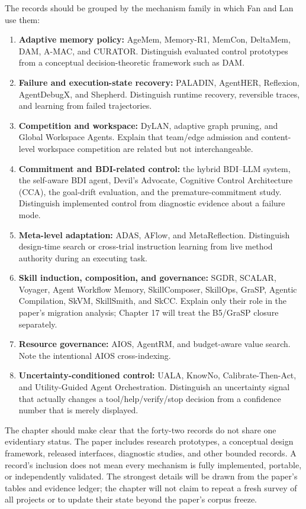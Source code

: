 The records should be grouped by the mechanism family in which Fan and Lan use them:
\begin{enumerate}
  \item \textbf{Adaptive memory policy:} AgeMem, Memory-R1, MemCon, DeltaMem, DAM, A-MAC, and CURATOR. Distinguish evaluated control prototypes from a conceptual decision-theoretic framework such as DAM.
  \item \textbf{Failure and execution-state recovery:} PALADIN, AgentHER, Reflexion, AgentDebugX, and Shepherd. Distinguish runtime recovery, reversible traces, and learning from failed trajectories.
  \item \textbf{Competition and workspace:} DyLAN, adaptive graph pruning, and Global Workspace Agents. Explain that team/edge admission and content-level workspace competition are related but not interchangeable.
  \item \textbf{Commitment and BDI-related control:} the hybrid BDI--LLM system, the self-aware BDI agent, Devil's Advocate, Cognitive Control Architecture (CCA), the goal-drift evaluation, and the premature-commitment study. Distinguish implemented control from diagnostic evidence about a failure mode.
  \item \textbf{Meta-level adaptation:} ADAS, AFlow, and MetaReflection. Distinguish design-time search or cross-trial instruction learning from live method authority during an executing task.
  \item \textbf{Skill induction, composition, and governance:} SGDR, SCALAR, Voyager, Agent Workflow Memory, SkillComposer, SkillOps, GraSP, Agentic Compilation, SkVM, SkillSmith, and SkCC. Explain only their role in the paper's migration analysis; Chapter 17 will treat the B5/GraSP closure separately.
  \item \textbf{Resource governance:} AIOS, AgentRM, and budget-aware value search. Note the intentional AIOS cross-indexing.
  \item \textbf{Uncertainty-conditioned control:} UALA, KnowNo, Calibrate-Then-Act, and Utility-Guided Agent Orchestration. Distinguish an uncertainty signal that actually changes a tool/help/verify/stop decision from a confidence number that is merely displayed.
\end{enumerate}

The chapter should make clear that the forty-two records do not share one evidentiary status. The paper includes research prototypes, a conceptual design framework, released interfaces, diagnostic studies, and other bounded records. A record's inclusion does not mean every mechanism is fully implemented, portable, or independently validated. The strongest details will be drawn from the paper's tables and evidence ledger; the chapter will not claim to repeat a fresh survey of all projects or to update their state beyond the paper's corpus freeze.

